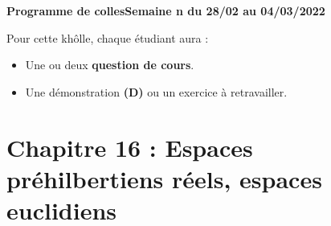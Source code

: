 \documentclass[twoside,a4paper,french,10pt]{VcCours}
\begin{document}

\begin{center}
\large\bf
Programme de collesSemaine n du 28/02 au 04/03/2022
\end{center}
\separationTitre


Pour cette khôlle, chaque étudiant aura :
\begin{itemize}
\item Une ou deux \textbf{question de cours}.
\item Une démonstration \textbf{(D)} ou un exercice à retravailler.
\end{itemize} 
  

\section*{Chapitre 16 : Espaces préhilbertiens réels, espaces euclidiens}
\end{document}

